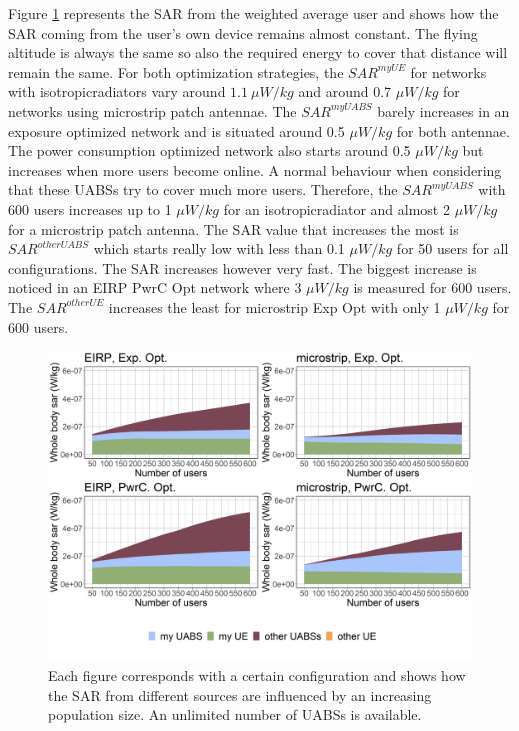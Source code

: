 \documentclass[twocolumn]{phdsymp} %
\begin{document}
Figure \ref{fig:s3b_fourSourcesMatrix} represents the 
\gls{SAR} from the weighted average user and shows how the \gls{SAR} coming from the user's own device remains almost constant. 
The flying altitude is always the same so 
also the required energy to cover that distance will remain the same. 
For both optimization strategies, the $SAR^{myUE}$ for networks with \gls{isotropicradiator}s vary around $1.1\ \mu W/kg$  %
 and around  0.7 $\mu W/kg$ for networks using microstrip patch antennae.
The $SAR^{myUABS}$ barely increases in an exposure optimized network and is situated around 0.5 $\mu W/kg$ for both antennae.
The power consumption optimized network also starts around 0.5 $\mu W/kg$ but increases when more users become online. 
A normal behaviour when considering that these \gls{UABS}s try to cover much more users. Therefore, the $SAR^{myUABS}$ 
with 600 users increases up to 1 $\mu W/kg$ for an \gls{isotropicradiator} and almost 2 $\mu W/kg$ for a microstrip patch antenna.
The \gls{SAR} value that increases the most is $SAR^{otherUABS}$ which 
starts really low with less than 0.1 $\mu W/kg$ for 50 users for all configurations. 
The \gls{SAR} increases however very fast. The biggest increase is noticed in an \gls{EIRP} \gls{PwrC Opt} network 
where 3 $\mu W/kg$ is measured for 600 users. The $SAR^{otherUE}$ increases the least for microstrip \gls{Exp Opt} with 
only 1 $\mu W/kg$ for 600 users.
\begin{figure}[h!]
  \includegraphics[width=\linewidth]{../results/s3/uFourSources.png}
  \caption{Each figure corresponds with a certain configuration and shows how the \acs{SAR} 
  from different sources are influenced by an increasing population size. An unlimited number of \acs{UABS}s is available.
}
  \label{fig:s3b_fourSourcesMatrix}
\end{figure}
\end{document}
